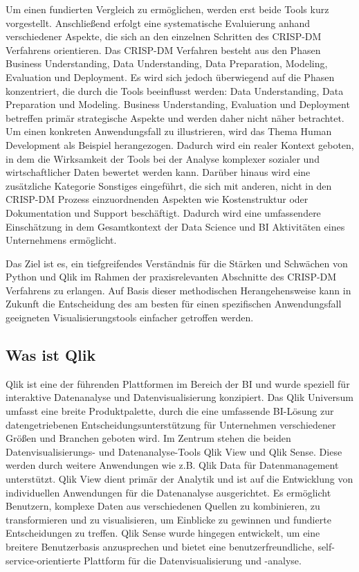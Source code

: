 \documentclass[12pt]{article}
\begin{document}
	Um einen fundierten Vergleich zu ermöglichen, werden erst beide Tools kurz vorgestellt. Anschließend erfolgt eine systematische Evaluierung anhand verschiedener Aspekte, die sich an den einzelnen Schritten des CRISP-DM Verfahrens orientieren. Das CRISP-DM Verfahren besteht aus den Phasen Business Understanding, Data Understanding, Data Preparation, Modeling, Evaluation und Deployment. Es wird sich jedoch überwiegend auf die Phasen konzentriert, die durch die Tools beeinflusst werden: Data Understanding, Data Preparation und Modeling. Business Understanding, Evaluation und Deployment betreffen primär strategische Aspekte und werden daher nicht näher betrachtet. Um einen konkreten Anwendungsfall zu illustrieren, wird das Thema Human Development als Beispiel herangezogen. Dadurch wird ein realer Kontext geboten, in dem die Wirksamkeit der Tools bei der Analyse komplexer sozialer und wirtschaftlicher Daten bewertet werden kann. Darüber hinaus wird eine zusätzliche Kategorie Sonstiges eingeführt, die sich mit anderen, nicht in den CRISP-DM Prozess einzuordnenden Aspekten wie Kostenstruktur oder Dokumentation und Support beschäftigt. Dadurch wird eine umfassendere Einschätzung in dem Gesamtkontext der Data Science und BI Aktivitäten eines Unternehmens ermöglicht.
	
	Das Ziel ist es, ein tiefgreifendes Verständnis für die Stärken und Schwächen von Python und Qlik im Rahmen der praxisrelevanten Abschnitte des CRISP-DM Verfahrens zu erlangen. Auf Basis dieser methodischen Herangehensweise kann in Zukunft die Entscheidung des am besten für einen spezifischen Anwendungsfall geeigneten Visualisierungstools einfacher getroffen werden.
	
	\subsection{Was ist Qlik}
	Qlik ist eine der führenden Plattformen im Bereich der BI und wurde speziell für interaktive Datenanalyse und Datenvisualisierung konzipiert. Das Qlik Universum umfasst eine breite Produktpalette, durch die eine umfassende BI-Lösung zur datengetriebenen Entscheidungsunterstützung für Unternehmen verschiedener Größen und Branchen geboten wird. Im Zentrum stehen die beiden Datenvisualisierungs- und Datenanalyse-Tools Qlik View und Qlik Sense. Diese werden durch weitere Anwendungen wie z.B. Qlik Data für Datenmanagement unterstützt. Qlik View dient primär der Analytik und ist auf die Entwicklung von individuellen Anwendungen für die Datenanalyse ausgerichtet. Es ermöglicht Benutzern, komplexe Daten aus verschiedenen Quellen zu kombinieren, zu transformieren und zu visualisieren, um Einblicke zu gewinnen und fundierte Entscheidungen zu treffen. Qlik Sense wurde hingegen entwickelt, um eine breitere Benutzerbasis anzusprechen und bietet eine benutzerfreundliche, self-service-orientierte Plattform für die Datenvisualisierung und -analyse.
	
\end{document}
